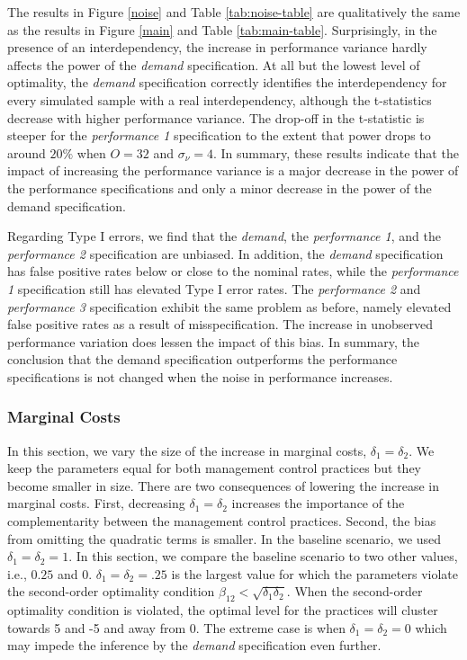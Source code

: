 \documentclass[12pt]{article}
\begin{document}


The results in Figure \ref{noise} and Table \ref{tab:noise-table} are qualitatively the same as the results in Figure \ref{main} and Table \ref{tab:main-table}. Surprisingly, in the presence of an interdependency, the increase in performance variance hardly affects the power of the \emph{demand} specification. At all but the lowest level of optimality, the \emph{demand} specification correctly identifies the interdependency for every simulated sample with a real interdependency, although the t-statistics decrease with higher performance variance. The drop-off in the t-statistic is steeper for the \emph{performance 1} specification to the extent that power drops to around \(20\%\) when \(O = 32\) and \(\sigma_{\nu} = 4\). In summary, these results indicate that the impact of increasing the performance variance is a major decrease in the power of the performance specifications and only a minor decrease in the power of the demand specification.

Regarding Type I errors, we find that the \emph{demand}, the \emph{performance 1}, and the \emph{performance 2} specification are unbiased. In addition, the \emph{demand} specification has false positive rates below or close to the nominal rates, while the \emph{performance 1} specification still has elevated Type I error rates. The \emph{performance 2} and \emph{performance 3} specification exhibit the same problem as before, namely elevated false positive rates as a result of misspecification. The increase in unobserved performance variation does lessen the impact of this bias. In summary, the conclusion that the demand specification outperforms the performance specifications is not changed when the noise in performance increases.

\subsubsection{Marginal Costs}\label{marginal-cost}
 
In this section, we vary the size of the increase in marginal costs, $\delta_1 = \delta_2$. We keep the parameters equal for both management control practices but they become smaller in size. There are two consequences of lowering the increase in marginal costs. First, decreasing $\delta_1 = \delta_2$ increases the importance of the complementarity between the management control practices. Second, the bias from omitting the quadratic terms is smaller. In the baseline scenario, we used $\delta_1 = \delta_2 = 1$. In this section, we compare the baseline scenario to two other values, i.e., $0.25$ and $0$. $\delta_1 = \delta_2 = .25$ is the largest value for which the parameters violate the second-order optimality condition $\beta_{12} < \sqrt{\delta_1 \delta_2}$. When the second-order optimality condition is violated, the optimal level for the practices will cluster towards 5 and -5 and away from  0. The extreme case is when $\delta_1 = \delta_2 = 0$ which may impede the inference by the \emph{demand} specification even further. 
\end{document}
